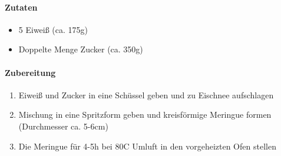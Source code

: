 \clearpage
{}

\paragraph{Zutaten}
\begin{itemize}[noitemsep]
	\item 5 Eiweiß (ca. 175g)
	\item Doppelte Menge Zucker (ca. 350g)
\end{itemize}

\paragraph{Zubereitung}
\begin{enumerate}[noitemsep]
	\item Eiweiß und Zucker in eine Schüssel geben und zu Eischnee aufschlagen
	\item Mischung in eine Spritzform geben und kreisförmige Meringue formen (Durchmesser ca. 5-6cm)
	\item Die Meringue für 4-5h bei 80\textdegree C Umluft in den vorgeheizten Ofen stellen
\end{enumerate}